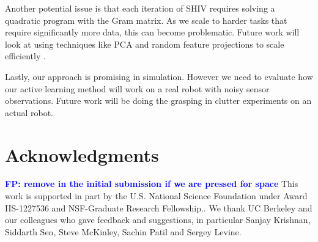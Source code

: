 \documentclass[10pt, conference]{ieeeconf}      %
\newcommand{\fpnote}[1]{\ifthenelse{\boolean{include-notes}}%
 {\textcolor{blue}{\textbf{FP: #1}}}{}}
\begin{document}
Another potential issue is that each iteration of SHIV requires solving a quadratic program with the Gram matrix. As we scale to harder tasks that require significantly more data, this can become problematic. Future work will look at using techniques like PCA and random feature projections to scale efficiently . 

Lastly, our approach is promising in simulation. However we need to evaluate how our active learning method will work on a real robot with noisy sensor observations. Future work will be doing the grasping in clutter experiments on an actual robot. 

\section{Acknowledgments} 
\fpnote{remove in the initial submission if we are pressed for space}
This work is supported in part by the U.S. National Science Foundation under Award IIS-1227536 and NSF-Graduate Research Fellowship.. 
We thank UC Berkeley and our colleagues who gave feedback and suggestions, in particular Sanjay Krishnan, Siddarth Sen, Steve McKinley, Sachin Patil and Sergey Levine.






\end{document}
